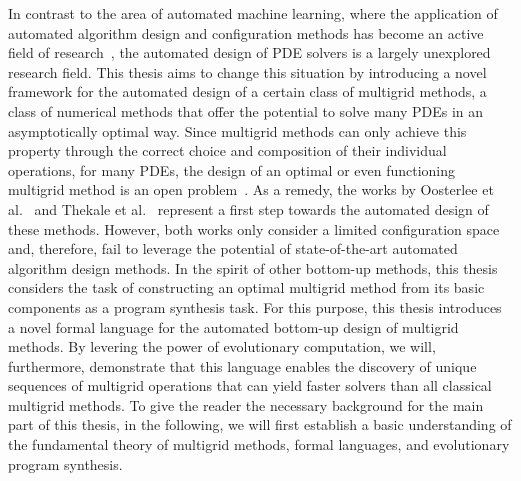 In contrast to the area of automated machine learning, where the application of automated algorithm design and configuration methods has become an active field of research~\cite{ren2021comprehensive,hutter2019automated,elsken2019neural,he2021automl,schrodi2022towards}, the automated design of PDE solvers is a largely unexplored research field.
This thesis aims to change this situation by introducing a novel framework for the automated design of a certain class of multigrid methods, a class of numerical methods that offer the potential to solve many PDEs in an asymptotically optimal way.
Since multigrid methods can only achieve this property through the correct choice and composition of their individual operations, for many PDEs, the design of an optimal or even functioning multigrid method is an open problem~\cite{trottenberg2000multigrid,ernst2012difficult}.
As a remedy, the works by Oosterlee et al.~\cite{oosterlee2003genetic} and Thekale et al.~\cite{thekale2010optimizing} represent a first step towards the automated design of these methods.
However, both works only consider a limited configuration space and, therefore, fail to leverage the potential of state-of-the-art automated algorithm design methods.
In the spirit of other bottom-up methods, this thesis considers the task of constructing an optimal multigrid method from its basic components as a program synthesis task.
For this purpose, this thesis introduces a novel formal language for the automated bottom-up design of multigrid methods.
By levering the power of evolutionary computation, we will, furthermore, demonstrate that this language enables the discovery of unique sequences of multigrid operations that can yield faster solvers than all classical multigrid methods.
To give the reader the necessary background for the main part of this thesis, in the following, we will first establish a basic understanding of the fundamental theory of multigrid methods, formal languages, and evolutionary program synthesis.  

